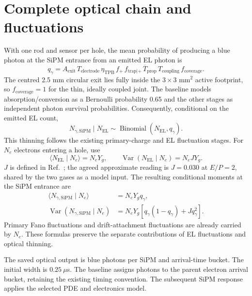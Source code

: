 \documentclass[11pt,a4paper]{article}
\begin{document}
\section{Complete optical chain and fluctuations}
With one rod and sensor per hole, the mean probability of producing a blue
photon at the SiPM entrance from an emitted EL photon is
\begin{equation}
 q_\gamma=A_{\mathrm{exit}}\,T_{\mathrm{electrode}}\,
 \eta_{\mathrm{TPB}}\,f_+\,f_{\mathrm{trap}|+}\,
 \overline T_{\mathrm{prop}}\,T_{\mathrm{coupling}}\,f_{\mathrm{coverage}}.
 \label{eq:chain}
\end{equation}
The centred 2.5 mm circular exit lies fully inside the $3\times3$ mm$^2$
active footprint, so $f_{\mathrm{coverage}}=1$ for the thin, ideally coupled
joint. The baseline models absorption/conversion as a Bernoulli probability
0.65 and the other stages as independent photon survival probabilities.
Consequently, conditional on the emitted EL count,
\begin{equation}
 N_{\gamma,\mathrm{SiPM}}\mid N_{\mathrm{EL}}
 \sim\operatorname{Binomial}(N_{\mathrm{EL}},q_\gamma).
\end{equation}
This thinning follows the existing primary-charge and EL fluctuation stages.
For $N_e$ electrons entering a hole, use
\begin{equation}
 \langle N_{\mathrm{EL}}\mid N_e\rangle=N_eY_g,\qquad
 \operatorname{Var}(N_{\mathrm{EL}}\mid N_e)=N_eJY_g.
\end{equation}
$J$ is defined in Ref.~\cite{Oliveira:2011xk}; the agreed approximate
reading is $J=0.030$ at $E/P=2$, shared by the two gases as a model input.
The resulting conditional moments at the SiPM entrance are
\begin{align}
 \langle N_{\gamma,\mathrm{SiPM}}\mid N_e\rangle&=N_eY_gq_\gamma,\\
 \operatorname{Var}(N_{\gamma,\mathrm{SiPM}}\mid N_e)
 &=N_eY_g\left[q_\gamma(1-q_\gamma)+Jq_\gamma^2\right].
\end{align}
Primary Fano fluctuations and drift-attachment fluctuations are already
carried by $N_e$. These formulas preserve the separate contributions of
EL fluctuations and optical thinning.

The saved optical output is blue photons per SiPM and arrival-time bucket.
The initial width is $0.25\ \mu$s. The baseline assigns photons to the parent
electron arrival bucket, retaining the existing timing convention. The
subsequent SiPM response applies the selected PDE and electronics model.
\end{document}

